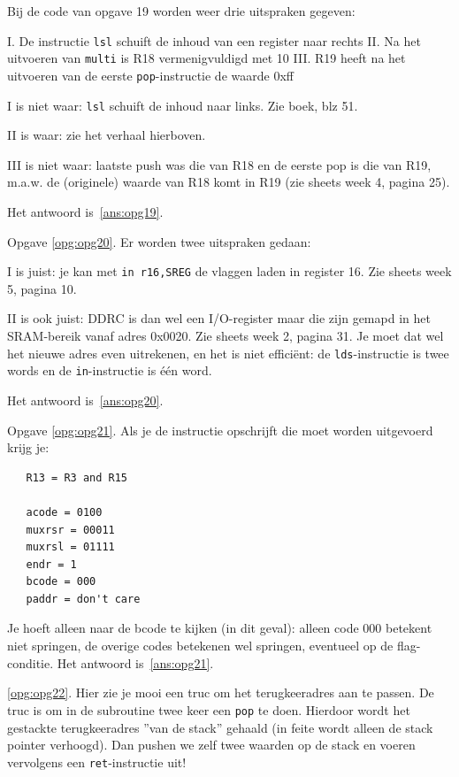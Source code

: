 \documentclass[a4paper,12pt,fleqn,dutch]{tisdexam}
\begin{document}
\begin{questions}
Bij de code van opgave 19 worden weer drie uitspraken gegeven:

I. De instructie \texttt{lsl} schuift de inhoud van een register naar rechts 
II. Na het uitvoeren van \texttt{multi} is R18 vermenigvuldigd met 10 
III. R19 heeft na het uitvoeren van de eerste \texttt{pop}-instructie de waarde 0x{f}{f} 

I is niet waar: \texttt{lsl} schuift de inhoud naar links. Zie boek, blz 51.

II is waar: zie het verhaal hierboven.

III is niet waar: laatste push was die van R18 en de eerste pop is die van R19,
m.a.w. de (originele) waarde van R18 komt in R19 (zie sheets week 4, pagina 25).

Het antwoord is~\ref{ans:opg19}.

\vspace{1em}
Opgave \ref{opg:opg20}. Er worden twee uitspraken gedaan:

I is juist: je kan met \texttt{in r16,SREG} de vlaggen laden in register 16.
Zie sheets week 5, pagina 10.

II is ook juist: DDRC is dan wel een I/O-register maar die zijn gemapd in het
SRAM-bereik vanaf adres 0x0020. Zie sheets week 2, pagina 31. Je moet dat wel
het nieuwe adres even uitrekenen, en het is niet effici\"{e}nt: de
\texttt{lds}-instructie is twee words en de \texttt{in}-instructie is
\'{e}\'{e}n word.

Het antwoord is~\ref{ans:opg20}.

\vspace{1em}
Opgave \ref{opg:opg21}. Als je de instructie opschrijft die moet worden uitgevoerd
krijg je:

\begin{verbatim}
   R13 = R3 and R15

   acode = 0100
   muxrsr = 00011
   muxrsl = 01111
   endr = 1
   bcode = 000
   paddr = don't care
\end{verbatim}

Je hoeft alleen naar de bcode te kijken (in dit geval): alleen code 000 betekent niet springen, de overige codes betekenen wel springen, eventueel op de flag-conditie. Het antwoord is~\ref{ans:opg21}.

\vspace{1em}
\label{opg:ant22}
\ref{opg:opg22}. Hier zie je mooi een truc om het terugkeeradres aan te passen.
De truc is om in de subroutine twee keer een \texttt{pop} te doen. Hierdoor wordt het
gestackte terugkeeradres ''van de stack'' gehaald (in feite wordt alleen de stack
pointer verhoogd). Dan pushen we zelf twee waarden op de stack en voeren
vervolgens een \texttt{ret}-instructie uit!


\end{questions}
\end{document}
